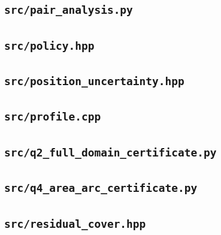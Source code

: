 \subsection*{\texttt{src/pair\_analysis.py}}

\subsection*{\texttt{src/policy.hpp}}

\subsection*{\texttt{src/position\_uncertainty.hpp}}

\subsection*{\texttt{src/profile.cpp}}

\subsection*{\texttt{src/q2\_full\_domain\_certificate.py}}

\subsection*{\texttt{src/q4\_area\_arc\_certificate.py}}

\subsection*{\texttt{src/residual\_cover.hpp}}

